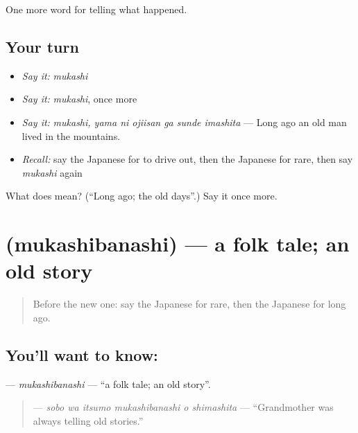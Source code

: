 \begin{grammarlens}[title={What you've built}]
One more word for telling what happened.
\end{grammarlens}

\subsection*{Your turn}
\begin{itemize}
\raggedright
  \item \emph{Say it:} \emph{mukashi}
  \item \emph{Say it:} \emph{mukashi}, once more
  \item \emph{Say it:} \emph{mukashi, yama ni ojiisan ga sunde imashita} — Long ago an old man lived in the mountains.
  \item \emph{Recall:} say the Japanese for to drive out, then the Japanese for rare, then say \emph{mukashi} again
\end{itemize}

\begin{tcolorbox}[breakable,colback=teal!4,colframe=teal!35!black,title={Before you move on}]
What does  mean? (\textquotedblleft{}Long ago; the old days\textquotedblright{}.) Say it once more.
\end{tcolorbox}
\section[\texorpdfstring{\ja{むかしばなし} (mukashibanashi)}{むかしばなし (mukashibanashi)}]{ (mukashibanashi) — a folk tale; an old story}

\label{lesson:JA-C298-mukashibanashi}



\begin{quote}
Before the new one: say the Japanese for rare, then the Japanese for long ago.
\end{quote}

\subsection*{You'll want to know: }
\textbf{} — \emph{mukashibanashi} — \textquotedblleft{}a folk tale; an old story\textquotedblright{}.

\begin{quote}
\textbf{   } — \emph{sobo wa itsumo mukashibanashi o shimashita} — \textquotedblleft{}Grandmother was always telling old stories.\textquotedblright{}
\end{quote}

